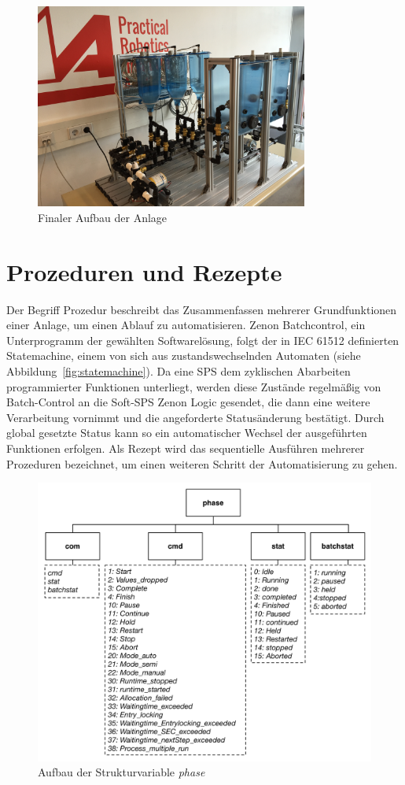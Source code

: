 	\begin{figure}[h!]
	  \centering
	  \includegraphics[width=0.8\textwidth]{graphics/implementation/FinalerAufbau.jpg}
	  \caption{Finaler Aufbau der Anlage}
	  \label{fig:finaler_aufbau}
	\end{figure}	

	\section{Prozeduren und Rezepte}
	Der Begriff Prozedur beschreibt das Zusammenfassen mehrerer Grundfunktionen einer Anlage, um einen Ablauf zu automatisieren. Zenon Batchcontrol, ein Unterprogramm der gewählten Softwarelösung, folgt der in IEC 61512 definierten Statemachine, einem von sich aus zustandswechselnden Automaten (siehe Abbildung~\ref{fig:statemachine}). Da eine \ac{SPS} dem zyklischen Abarbeiten programmierter Funktionen unterliegt, werden diese Zustände regelmäßig von Batch-Control an die Soft-\ac{SPS} Zenon Logic gesendet, die dann eine weitere Verarbeitung vornimmt und die angeforderte Statusänderung bestätigt. Durch global gesetzte Status kann so ein automatischer Wechsel der ausgeführten Funktionen erfolgen. Als Rezept wird das sequentielle Ausführen mehrerer Prozeduren bezeichnet, um einen weiteren Schritt der Automatisierung zu gehen.\\

\begin{figure}[h!]
  \centering
  \includegraphics[height=0.6\textwidth]{graphics/implementation/Datentyp_Phase.jpg}
  \caption{Aufbau der Strukturvariable \glqq \textit{phase}\grqq}
  \label{fig:var_phase}
\end{figure}
	
